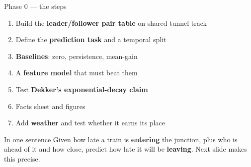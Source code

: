 \documentclass[aspectratio=169,10pt]{beamer}
\begin{document}
\begin{frame}{Phase 0 --- the steps}
  \begin{enumerate}
    \item Build the \textbf{leader/follower pair table} on shared tunnel track
    \item Define the \textbf{prediction task} and a temporal split
    \item \textbf{Baselines}: zero, persistence, mean-gain
    \item A \textbf{feature model} that must beat them
    \item Test \textbf{Dekker's exponential-decay claim}
    \item Facts sheet and figures
    \item Add \textbf{weather} and test whether it earns its place
  \end{enumerate}

  \vspace{1em}
  \begin{block}{\small In one sentence}
    \small Given how late a train is \textbf{entering} the junction, plus who is ahead of it
    and how close, predict how late it will be \textbf{leaving}. Next slide makes this precise.
  \end{block}
\end{frame}
\end{document}

